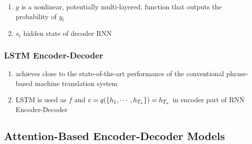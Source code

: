 \begin{enumerate}
\begin{enumerate}
        \item $g$ is a nonlinear, potentially multi-layered, function that outputs the probability of $y_t$
        \hfill \cite{adv-ml-tech/paper/arxiv.org/1409.0473}

        \item $s_t$ hidden state of decoder RNN
        \hfill \cite{adv-ml-tech/paper/arxiv.org/1409.0473}
    \end{enumerate}
\end{enumerate}







\subsubsection{LSTM Encoder-Decoder}
\begin{enumerate}
    \item achieves close to the state-of-the-art performance of the conventional phrase-based machine translation system
    \hfill \cite{adv-ml-tech/paper/arxiv.org/1409.0473}

    \item LSTM is used as $f$ and $c = q(\left\{h_1, \cdots, h_{T_x}\right\}) = h_{T_x}$ in encoder part of RNN Encoder-Decoder
    \hfill \cite{adv-ml-tech/paper/arxiv.org/1409.0473}
\end{enumerate}










\subsection{Attention-Based Encoder-Decoder Models}

